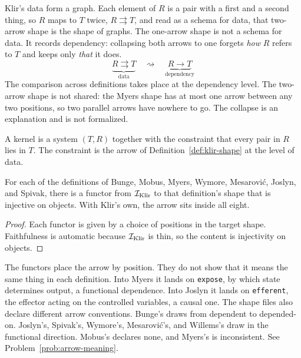 \begin{remark}
  Klir's data form a graph. Each element of $R$ is a pair with a first and
  a second thing, so $R$ maps to $T$ twice, $R \rightrightarrows T$, and
  read as a schema for data, that two-arrow shape is the shape of graphs.
  The one-arrow shape is not a schema for data. It records dependency:
  collapsing both arrows to one forgets \emph{how} $R$ refers to $T$ and
  keeps only \emph{that} it does.
  \[
    \underbrace{R \rightrightarrows T}_{\text{data}}
    \quad\rightsquigarrow\quad
    \underbrace{R \longrightarrow T}_{\text{dependency}}
  \]
  The comparison across definitions takes place at the dependency level.
  The two-arrow shape is not shared: the Myers shape has at most one arrow
  between any two positions, so two parallel arrows have nowhere to go.
  The collapse is an explanation and is not formalized.
\end{remark}

\begin{definition}[Kernel]
  \label{def:kernel}
  \leanok
  A kernel is a system $(T, R)$ together with the constraint that every pair
  in $R$ lies in $T$. The constraint is the arrow of
  Definition~\ref{def:klir-shape} at the level of data.
\end{definition}

\begin{theorem}
  \label{thm:existence}
  \leanok
  For each of the definitions of Bunge, Mobus, Myers, Wymore, Mesarovi\'c,
  Joslyn, and Spivak, there is a functor from $\mathcal{I}_{\mathrm{Klir}}$ to that definition's
  shape that is injective on objects. With Klir's own, the arrow sits inside
  all eight.
\end{theorem}

\begin{proof}
  \leanok
  Each functor is given by a choice of positions in the target shape.
  Faithfulness is automatic because $\mathcal{I}_{\mathrm{Klir}}$ is thin, so the content is
  injectivity on objects.
\end{proof}

\begin{remark}
  The functors place the arrow by position. They do not show that it means
  the same thing in each definition. Into Myers it lands on
  \texttt{expose}, by which state determines output, a functional
  dependence. Into Joslyn it lands on \texttt{efferent}, the effector acting
  on the controlled variables, a causal one. The shape files also declare
  different arrow conventions. Bunge's draws from dependent to depended-on.
  Joslyn's, Spivak's, Wymore's, Mesarovi\'c's, and Willems's draw in the
  functional direction. Mobus's declares none, and Myers's is inconsistent.
  See Problem~\ref{prob:arrow-meaning}.
\end{remark}

